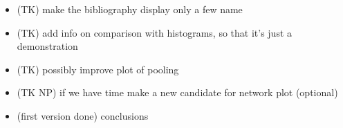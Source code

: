 \documentclass[final,twocolumn,3p,times,authoryear]{elsarticle}
\newcommand{\nati}[1]{{\color[rgb]{.1,.6,.1}{#1}}}
\newcommand{\1}{\b{1}}              %
\newcommand{\0}{\b{0}}              %
\begin{document}
\begin{itemize}[noitemsep,topsep=0pt,parsep=0pt,partopsep=0pt]
    \item (TK) make the bibliography display only a few name
    \item (TK) add info on comparison with histograms, so that it's just a demonstration
    \item (TK) possibly improve plot of pooling
    \item (TK NP) if we have time make a new candidate for network plot (optional)
    \item (first version done) conclusions

\end{itemize}
\end{document}
